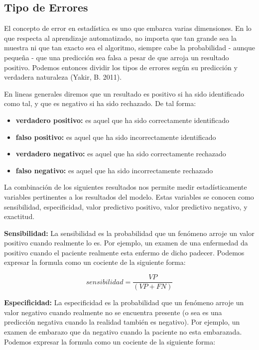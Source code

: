 \subsection{Tipo de Errores}
El concepto de error en estadística es uno que embarca varias dimensiones. En lo que respecta al aprendizaje automatizado, no importa que tan grande sea la muestra ni que tan exacto sea el algoritmo, siempre cabe la probabilidad - aunque pequeña - que una predicción sea falsa a pesar de que arroja un resultado positivo. Podemos entonces dividir los tipos de errores según su predicción y verdadera naturaleza (Yakir, B. 2011).

En lineas generales diremos que un resultado es positivo si ha sido identificado como tal, y que es negativo si ha sido rechazado. De tal forma:
\begin{itemize}
	\item \textbf{verdadero positivo:} es aquel que ha sido correctamente identificado
	\item \textbf{falso positivo:} es aquel que ha sido incorrectamente identificado
	\item \textbf{verdadero negativo:} es aquel que ha sido correctamente rechazado
	\item \textbf{falso negativo:} es aquel que ha sido incorrectamente rechazado
\end{itemize}

La combinación de los siguientes resultados nos permite medir estadísticamente variables pertinentes a los resultados del modelo. Estas variables se conocen como sensibilidad, especificidad, valor predictivo positivo, valor predictivo negativo, y exactitud.

\textbf{Sensibilidad:} La sensibilidad es la probabilidad que un fenómeno arroje un valor positivo cuando realmente lo es. Por ejemplo, un examen de una enfermedad da positivo cuando el paciente realmente esta enfermo de dicho padecer. Podemos expresar la formula como un cociente de la siguiente forma:

\begin{equation}
sensibilidad = \frac{VP}{(VP + FN)}
\end{equation}

\textbf{Especificidad:} La especificidad es la probabilidad que un fenómeno arroje un valor negativo cuando realmente no se encuentra presente (o sea es una predicción negativa cuando la realidad también es negativo). Por ejemplo, un examen de embarazo que da negativo cuando la paciente no esta embarazada. Podemos expresar la formula como un cociente de la siguiente forma:

